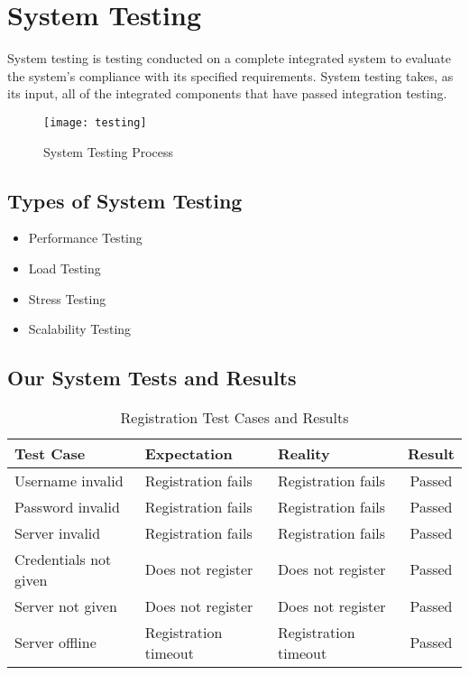 \chapter{System Testing}
System testing is testing conducted on a complete integrated system to evaluate the system's compliance with its specified requirements. System testing takes, as its input, all of the integrated components that have passed integration testing.

\begin{figure}[H]
    \centering
    \texttt{[image: testing]}
    \caption{System Testing Process}
    \label{fig:testing_process}
\end{figure}

\section{Types of System Testing}
\begin{itemize}
 \item Performance Testing
 \item Load Testing
 \item Stress Testing
 \item Scalability Testing
\end{itemize}
\clearpage

\section{Our System Tests and Results}

\begin{table}[H]
    \centering
    \begin{tabular}{|l|l|l|c|} \hline
        Test Case & Expectation & Reality & Result \\\hline\hline
        Username invalid & Registration fails & Registration fails & Passed \\\hline
        Password invalid & Registration fails & Registration fails & Passed \\\hline
        Server invalid & Registration fails & Registration fails & Passed \\\hline
        Credentials not given & Does not register & Does not register & Passed \\\hline
        Server not given & Does not register & Does not register & Passed \\\hline
        Server offline & Registration timeout & Registration timeout & Passed \\\hline
    \end{tabular}
    \caption{Registration Test Cases and Results}
    \label{tab:reg_test}
\end{table}

